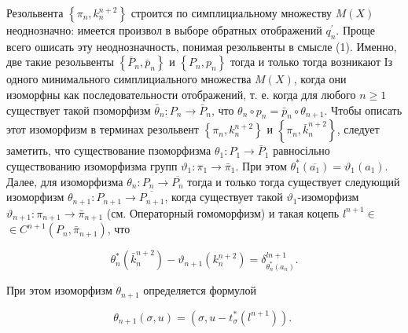 \documentclass[10pt]{article}
\begin{document}
Резольвента $\left\{\pi_{n}, k_{n}^{n+2}\right\}$ строится по симплициальному множеству $M(X)$ неоднозначно: имеется произвол в выборе обратных отображений $q_{n}^{\prime}$. Проще всего ошисать эту неоднозначность, понимая резольвенты в смысле (1). Именно, две такие резольвенты $\left\{\bar{P}_{n}, \bar{p}_{n}\right\}$ и $\left\{P_{n}, p_{n}\right\}$ тогда и только тогда возникают Із одного минимального симплициального множества $M(X)$, когда они изоморфны как последовательности отображений, т. е. когда для любого $n \geqslant 1$ существует такой пзоморфизм $\bar{\theta}_{n}: P_{n} \rightarrow \bar{P}_{n}$, что $\theta_{n} \circ p_{n}=\bar{p}_{n} \circ \theta_{n+1}$. Чтобы описать этот изоморфизм в терминах резольвент $\left\{\pi_{n}, k_{n}^{n+2}\right\}$ и $\left\{\pi_{n}, \bar{k}_{n}^{n+2}\right\}$, следует заметить, что существование пзоморфизма $\theta_{1}: P_{1} \rightarrow \bar{P}_{1}$ равносільно существованию изоморфизма групп $\vartheta_{1}: \pi_{1} \rightarrow \bar{\pi}_{1}$. При этом $\theta_{1}^{*}\left(\overline{a_{1}}\right)=\vartheta_{1}\left(a_{1}\right)$. Далее, для изоморфизма $\theta_{n}: P_{n} \rightarrow \overline{P_{n}}$ тогда и только тогда существует следующий изоморфизм $\theta_{n+1}: P_{n+1} \rightarrow \overline{P_{n+1}}$, когда существует такой $\vartheta_{1}$-изоморфизм $\vartheta_{n+1}: \pi_{n+1} \rightarrow \bar{\pi}_{n+1}$ (см. Операторный гомоморфизм) и такая коцепь $l^{n+1} \in$ $\in C^{n+1}\left(P_{n}, \bar{\pi}_{n+1}\right)$, что



\[

\theta_{n}^{*}\left(\bar{k}_{n}^{n+2}\right)-\vartheta_{n+1}\left(k_{n}^{n+2}\right)=\delta_{\theta_{n}^{*}\left(a_{n}\right)}^{l n+1} .

\]



При этом изоморфизм $\theta_{n+1}$ определяется формулой



\[

\theta_{n+1}(\sigma, u)=\left(\sigma, u-t_{\sigma}^{*}\left(l^{n+1}\right)\right) \text {. }

\]
\end{document}
